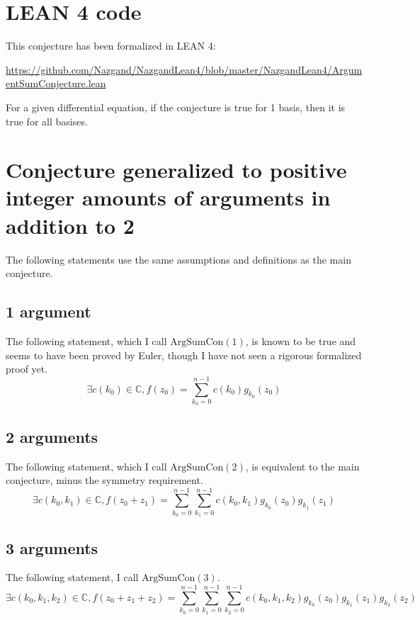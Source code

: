 \documentclass[]{article}
\newcommand{\pqty}[1]{{\left(#1\right)}}
\numberwithin{equation}{section}
\begin{document}
	\section{LEAN 4 code}
		This conjecture has been formalized in LEAN 4:
		
		\href{https://github.com/Nazgand/NazgandLean4/blob/master/NazgandLean4/ArgumentSumConjecture.lean}{https://github.com/Nazgand/NazgandLean4/blob/master/NazgandLean4/ArgumentSumConjecture.lean}
		
		For a given differential equation, if the conjecture is true for 1 basis, then it is true for all basises.
	
	\section{Conjecture generalized to positive integer amounts of arguments in addition to 2}
	The following statements use the same assumptions and definitions as the main conjecture.
	\subsection{1 argument}
	The following statement, which I call $\text{ArgSumCon}\pqty{1}$, is known to be true and seems to have been proved by Euler, though I have not seen a rigorous formalized proof yet.
	\begin{equation}
		\exists c\pqty{k_0}\in\mathbb{C}, f\pqty{z_0} = \sum_{k_0=0}^{n-1}c\pqty{k_0} g_{k_0}\pqty{z_0}
	\end{equation}
	
	\subsection{2 arguments}
	The following statement, which I call $\text{ArgSumCon}\pqty{2}$, is equivalent to the main conjecture, minus the symmetry requirement.
	\begin{equation}
		\exists c\pqty{k_0,k_1}\in\mathbb{C}, f\pqty{z_0+z_1} = \sum_{k_0=0}^{n-1}\sum_{k_1=0}^{n-1}c\pqty{k_0,k_1} g_{k_0}\pqty{z_0} g_{k_1}\pqty{z_1}
	\end{equation}
	
	\subsection{3 arguments}
	The following statement, I call $\text{ArgSumCon}\pqty{3}$.
	\begin{equation}
		\exists c\pqty{k_0,k_1,k_2}\in\mathbb{C}, f\pqty{z_0+z_1+z_2} =
		\sum_{k_0=0}^{n-1}\sum_{k_1=0}^{n-1}\sum_{k_2=0}^{n-1}c\pqty{k_0,k_1,k_2} g_{k_0}\pqty{z_0} g_{k_1}\pqty{z_1} g_{k_2}\pqty{z_2}
	\end{equation}
	
\end{document}
